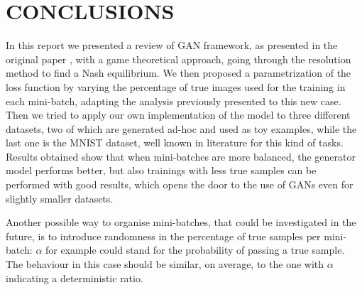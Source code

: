 \section{CONCLUSIONS} \label{conclusions}

In this report we presented a review of GAN framework, as presented in the original paper \cite{NIPS2014_5423}, with a game theoretical approach, going through the resolution method to find a Nash equilibrium. We then proposed a parametrization of the loss function by varying the percentage of true images used for the training in each mini-batch, adapting the analysis previously presented to this new case. Then we tried to apply our own implementation of the model to three different datasets, two of which are generated ad-hoc and used as toy examples, while the last one is the MNIST dataset, well known in literature for this kind of tasks.
Results obtained show that when mini-batches are more balanced, the generator model performs better, but also trainings with less true samples can be performed with good results, which opens the door to the use of GANs even for slightly smaller datasets.

Another possible way to organise mini-batches, that could be investigated in the future, is to introduce randomness in the percentage of true samples per mini-batch: $\alpha$ for example could stand for the probability of passing a true sample. The behaviour in this case should be similar, on average, to the one with $\alpha$ indicating a deterministic ratio.